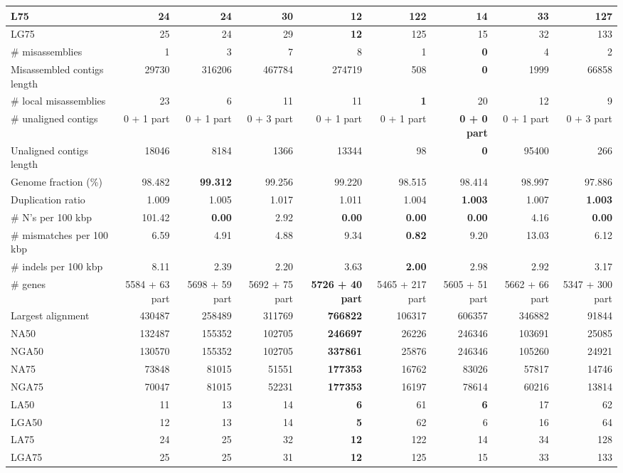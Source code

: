 \documentclass[12pt,a4paper]{article}
\begin{document}
\begin{table}[ht]
\begin{center}
\begin{tabular}{|l*{8}{|r}|}
L75 & 24 & 24 & 30 & {\bf 12} & 122 & 14 & 33 & 127 \\ \hline
LG75 & 25 & 24 & 29 & {\bf 12} & 125 & 15 & 32 & 133 \\ \hline
\# misassemblies & 1 & 3 & 7 & 8 & 1 & {\bf 0} & 4 & 2 \\ \hline
Misassembled contigs length & 29730 & 316206 & 467784 & 274719 & 508 & {\bf 0} & 1999 & 66858 \\ \hline
\# local misassemblies & 23 & 6 & 11 & 11 & {\bf 1} & 20 & 12 & 9 \\ \hline
\# unaligned contigs & 0 + 1 part & 0 + 1 part & 0 + 3 part & 0 + 1 part & 0 + 1 part & {\bf 0 + 0 part} & 0 + 1 part & 0 + 3 part \\ \hline
Unaligned contigs length & 18046 & 8184 & 1366 & 13344 & 98 & {\bf 0} & 95400 & 266 \\ \hline
Genome fraction (\%) & 98.482 & {\bf 99.312} & 99.256 & 99.220 & 98.515 & 98.414 & 98.997 & 97.886 \\ \hline
Duplication ratio & 1.009 & 1.005 & 1.017 & 1.011 & 1.004 & {\bf 1.003} & 1.007 & {\bf 1.003} \\ \hline
\# N's per 100 kbp & 101.42 & {\bf 0.00} & 2.92 & {\bf 0.00} & {\bf 0.00} & {\bf 0.00} & 4.16 & {\bf 0.00} \\ \hline
\# mismatches per 100 kbp & 6.59 & 4.91 & 4.88 & 9.34 & {\bf 0.82} & 9.20 & 13.03 & 6.12 \\ \hline
\# indels per 100 kbp & 8.11 & 2.39 & 2.20 & 3.63 & {\bf 2.00} & 2.98 & 2.92 & 3.17 \\ \hline
\# genes & 5584 + 63 part & 5698 + 59 part & 5692 + 75 part & {\bf 5726 + 40 part} & 5465 + 217 part & 5605 + 51 part & 5662 + 66 part & 5347 + 300 part \\ \hline
Largest alignment & 430487 & 258489 & 311769 & {\bf 766822} & 106317 & 606357 & 346882 & 91844 \\ \hline
NA50 & 132487 & 155352 & 102705 & {\bf 246697} & 26226 & 246346 & 103691 & 25085 \\ \hline
NGA50 & 130570 & 155352 & 102705 & {\bf 337861} & 25876 & 246346 & 105260 & 24921 \\ \hline
NA75 & 73848 & 81015 & 51551 & {\bf 177353} & 16762 & 83026 & 57817 & 14746 \\ \hline
NGA75 & 70047 & 81015 & 52231 & {\bf 177353} & 16197 & 78614 & 60216 & 13814 \\ \hline
LA50 & 11 & 13 & 14 & {\bf 6} & 61 & {\bf 6} & 17 & 62 \\ \hline
LGA50 & 12 & 13 & 14 & {\bf 5} & 62 & 6 & 16 & 64 \\ \hline
LA75 & 24 & 25 & 32 & {\bf 12} & 122 & 14 & 34 & 128 \\ \hline
LGA75 & 25 & 25 & 31 & {\bf 12} & 125 & 15 & 33 & 133 \\ \hline
\end{tabular}
\end{center}
\end{table}
\end{document}
